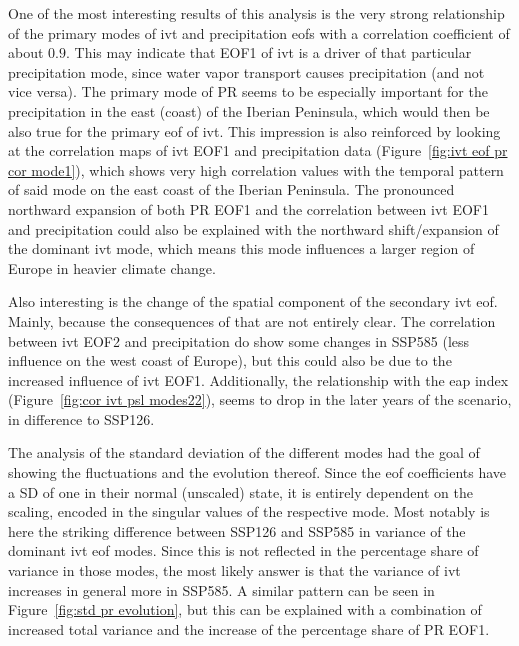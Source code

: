 One of the most interesting results of this analysis is the very strong relationship of the primary modes of \ac{ivt} and precipitation \acp{eof} with a correlation coefficient of about $0.9$.
This may indicate that EOF1 of \ac{ivt} is a driver of that particular precipitation mode, since water vapor transport causes precipitation (and not vice versa). 
The primary mode of PR seems to be especially important for the precipitation in the east (coast) of the Iberian Peninsula, which would then be also true for the primary \ac{eof} of \ac{ivt}. 
This impression is also reinforced by looking at the correlation maps of \ac{ivt} EOF1 and precipitation data (Figure~\ref{fig:ivt eof pr cor mode1}), which shows very high correlation values with the temporal pattern of said mode on the east coast of the Iberian Peninsula. 
The pronounced northward expansion of both PR EOF1 and the correlation between \ac{ivt} EOF1 and precipitation could also be explained with the northward shift/expansion of the dominant \ac{ivt} mode, which means this mode influences a larger region of Europe in heavier climate change. 

Also interesting is the change of the spatial component of the secondary \ac{ivt} \ac{eof}. 
Mainly, because the consequences of that are not entirely clear. 
The correlation between \ac{ivt} EOF2 and precipitation do show some changes in SSP585 (less influence on the west coast of Europe), but this could also be due to the increased influence of \ac{ivt} EOF1. 
Additionally, the relationship with the \ac{eap} index (Figure~\ref{fig:cor ivt psl modes22}), seems to drop in the later years of the scenario, in difference to SSP126. 

The analysis of the standard deviation of the different modes had the goal of showing the fluctuations and the evolution thereof. 
Since the \ac{eof} coefficients have a SD of one in their normal (unscaled) state, it is entirely dependent on the scaling, encoded in the singular values of the respective mode.  
Most notably is here the striking difference between SSP126 and SSP585 in variance of the dominant \ac{ivt} \ac{eof} modes. 
Since this is not reflected in the percentage share of variance in those modes, the most likely answer is that the variance of \ac{ivt} increases in general more in SSP585.
A similar pattern can be seen in Figure~\ref{fig:std pr evolution}, but this can be explained with a combination of increased total variance and the increase of the percentage share of PR EOF1. 

